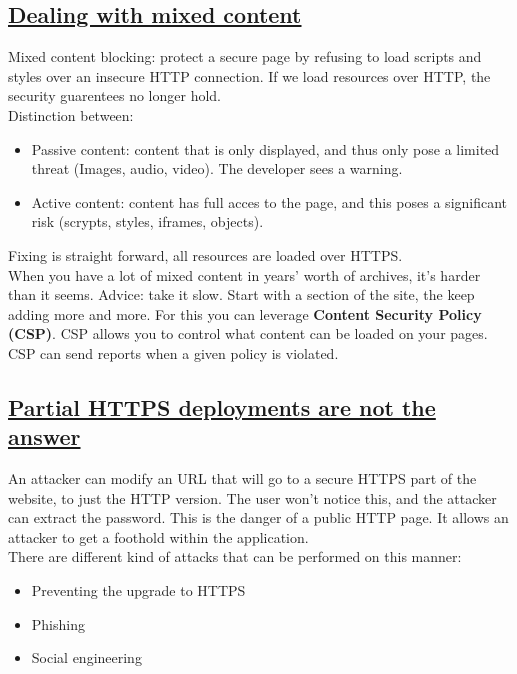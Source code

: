 \documentclass[titlepage]{article}
\begin{document}
    \subsection{\href{https://youtu.be/T2whfkfkKAU}{Dealing with mixed content}}
    Mixed content blocking: protect a secure page by refusing to load scripts and styles over an insecure HTTP connection. If  we load resources over HTTP, the security guarentees no longer hold.\\
    Distinction between:
    \begin{itemize}
        \item Passive content: content that is only displayed, and thus only pose a limited threat (Images, audio, video). The developer sees a warning.
        \item Active content: content has full acces to the page, and this poses a significant risk (scrypts, styles, iframes, objects).
    \end{itemize}
    Fixing is straight forward, all resources are loaded over HTTPS.\\
    When you have a lot of mixed content in years' worth of archives, it's harder than it seems. Advice: take it slow. Start with a section of the site, the keep adding more and more. For this you can leverage \textbf{Content Security Policy (CSP)}. CSP allows you to control what content can be loaded on your pages. CSP can send reports when a given policy is violated.
    \subsection{\href{https://youtu.be/BxH1EaVFEYg}{Partial HTTPS deployments are not the answer}}
    An attacker can modify an URL that will go to a secure HTTPS part of the website, to just the HTTP version. The user won't notice this, and the attacker can extract the password. This is the danger of a public HTTP page. It allows an attacker to get a foothold within the application.\\
    There are different kind of attacks that can be performed on this manner:
    \begin{itemize}
        \item Preventing the upgrade to HTTPS
        \item Phishing 
        \item Social engineering 
    \end{itemize}
\end{document}
